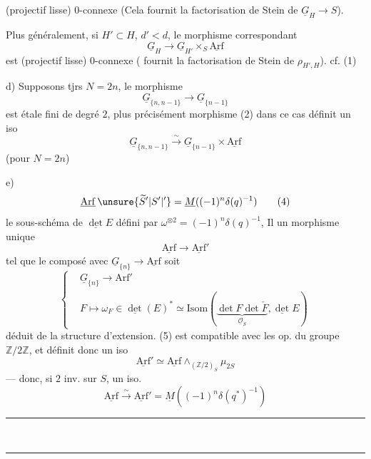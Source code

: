 (projectif lisse) $0$-connexe (Cela fournit la factorisation de Stein de $\underline{G}_H\longrightarrow S$).

Plus généralement, si $H'\subset H$, $d'<d$, le morphisme  correspondant
\[
\underline{G}_H\longrightarrow\underline{G}_{H'}\times_S\underline{\mathrm{Arf}}\tag*{(2)}
\]
est (projectif lisse) $0$-connexe ( fournit la factorisation de Stein de $\rho_{H',H}$). cf. (1)

d)  Supposons tjrs $N=2n$, le morphisme
\[
\underline{G}_{\{n,n-1\}}\longrightarrow\underline{G}_{\{n-1\}}\tag*{(3)}
\]
est étale fini de degré $2$, plus précisément  morphisme (2) dans ce cas définit un iso
\[
\underline{G}_{\{n,n-1\}}\xrightarrow{\sim}\underline{G}_{\{n-1\}}\times\underline{\mathrm{Arf}}
\]
(pour $N=2n$)

e)  %
\[
\underline{\mathrm{Arf}}\,\unsure{\widetilde S'|S'|{}'}=\underline{M}((-1)^n\delta(q)^{-1})\tag*{(4)}
\]
 le sous-schéma de $\underline{\det} E$ défini par $\omega^{\otimes 2}=(-1)^n\delta(q)^{-1}$, Il   un morphisme unique
\[
\underline{\mathrm{Arf}}\longrightarrow\underline{\mathrm{Arf}}'\tag*{(5)}
\]
tel que le composé avec $\underline{G}_{\{n\}}\longrightarrow\underline{\mathrm{Arf}}$ soit
\[
\left\{\begin{aligned}
&\underline{G}_{\{n\}}\longrightarrow\mathrm{Arf}'\\
&F\longmapsto\omega_F\in\underline{\det}(E)^*\simeq\mathrm{Isom}(\underbrace{\det F\det\check F}_{\underline{\mathcal O}_S},\underline{\det} E)
\end{aligned}\right.\tag*{(6)}
\]
déduit de la structure d'extension.  (5) est compatible avec les op. du groupe $\mathbb Z/2\mathbb Z$, et définit donc un iso
\[
\underline{\mathrm{Arf}}'\simeq\underline{\mathrm{Arf}}\mathbin{\wedge}_{(\mathbb Z/2)_S}\mu_{2S}\tag*{(7)}
\]
--- donc, si $2$ inv. sur $S$, un iso.
\[
\underline{\mathrm{Arf}}\xrightarrow{\sim}\underline{\mathrm{Arf}}'=\underline M((-1)^n\delta(q^{*})^{-1})
\]


\begin{center}\rule{.24\linewidth}{.4pt}\\[-.5ex]\rule{.15\linewidth}{.4pt}\end{center}

